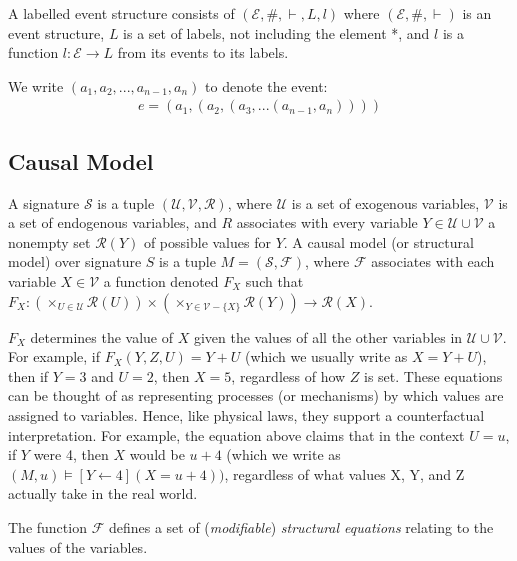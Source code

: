 \begin{definition}
    A labelled event structure consists of $(\mathcal{E},\#,\vdash,L,l)$ where
    $(\mathcal{E},\#,\vdash)$ is an event structure, $L$ is a set of labels,
    not including the element *, and $l$ is a function $l: \mathcal{E} \rightarrow L$
    from its events to its labels.
\end{definition}
\begin{notion}
    We write $(a_1,a_2,...,a_{n-1},a_n)$ to denote the event:
    \begin{align*}
        e = (a_1,(a_2,(a_3,...(a_{n-1},a_n))))
    \end{align*}
\end{notion}

\subsection{Causal Model}

A signature $\mathcal{S}$ is a tuple $(\mathcal{U},\mathcal{V},\mathcal{R})$,
where $\mathcal{U}$ is a set of exogenous variables, $\mathcal{V}$
is a set of endogenous variables, and $R$ associates with every variable
$Y\in \mathcal{U}\cup \mathcal{V}$ a nonempty set $\mathcal{R}(Y)$ of possible values for $Y$.
A causal model (or structural model) over signature $S$ is a tuple
$M=(\mathcal{S},\mathcal{F})$, where $\mathcal{F}$ associates with
each variable $X \in \mathcal{V}$ a function denoted $F_X$ such that
$F_X: (\times_{U\in \mathcal{U}}\mathcal{R}(U))\times (\times_{Y\in\mathcal{V}-\{X\}}\mathcal{R}(Y))\rightarrow \mathcal{R}(X)$.

$F_X$ determines the value of $X$ given the values of all the other variables
in $\mathcal{U}\cup \mathcal{V}$.
For example, if $F_X(Y,Z,U)=Y+U$ (which we usually write as $X = Y + U$),
then if $Y=3$ and $U=2$, then $X = 5$, regardless of how $Z$ is set.
These equations can be thought of as representing processes (or mechanisms) by which values are assigned to variables. Hence, like physical laws, they support a counterfactual interpretation.
For example, the equation above claims that in the context $U=u$, if $Y$ were 4, then $X$ would be $u+4$ (which we write as $(M,u) \models [Y\leftarrow 4](X = u + 4))$, regardless of what values X, Y, and Z actually take in the real world.


The function $\mathcal{F}$ defines a set of (\textit{modifiable}) \textit{structural equations} relating to the values of the variables.



